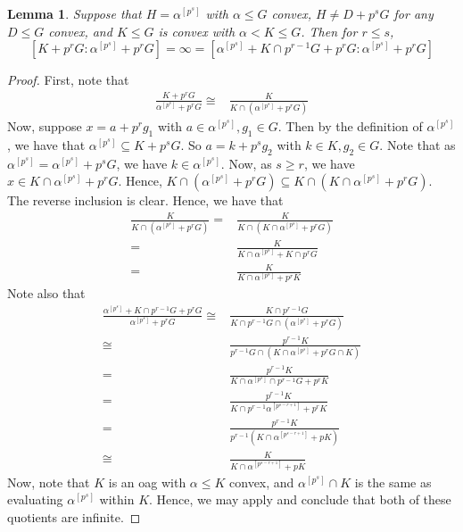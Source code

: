 \documentclass[10pt,a4paper]{amsart}
\newtheorem{lemma}{Lemma}
\begin{document}
\begin{lemma}\label{leftnonconvexconvexrelationship}
	Suppose that $H=\alpha^{[p^s]}$ with $\alpha\leq G$ convex, $H\neq D+p^sG$ for any $D\leq G$ convex, and $K\leq G$ is convex with $\alpha <K\leq G$. Then for $r\leq s$, $$[K+p^rG:\alpha^{[p^s]}+p^rG] =\infty = [\alpha^{[p^s]}+K\cap p^{r-1}G+p^rG:\alpha^{[p^s]}+p^rG] $$
\end{lemma}

\begin{proof}
	First, note that 
	\begin{align*}
		\frac{K+p^rG}{\alpha^{[p^s]}+p^rG} \cong& \frac{K}{K\cap(\alpha^{[p^s]}+p^rG)} %
	\end{align*}
	Now, suppose $x = a+p^rg_1$ with $a\in \alpha^{[p^s]}, g_1\in G$. Then by the definition of $\alpha^{[p^s]}$, we have that $\alpha^{[p^s]}\subseteq K+p^sG$. So $a = k + p^sg_2$ with $k\in K, g_2\in G$. Note that as $\alpha^{[p^s]} = \alpha^{[p^s]}+p^sG$, we have $k\in \alpha^{[p^s]}$. Now, as $s\geq r$, we have $x\in K\cap\alpha^{[p^s]}+p^rG$. Hence, $K\cap (\alpha^{[p^s]}+p^rG)\subseteq K\cap(K\cap\alpha^{[p^s]}+p^rG)$. The reverse inclusion is clear. Hence, we have that 
	\begin{align*}
		\frac{K}{K\cap(\alpha^{[p^s]}+p^rG)} = & \frac{K}{K\cap(K\cap \alpha^{[p^s]}+p^rG)} \\
		= & \frac{K}{K\cap \alpha^{[p^s]}+K\cap p^rG} \\
		= & \frac{K}{K\cap \alpha^{[p^s]}+p^rK}
	\end{align*}
	Note also that
	\begin{align*}
		\frac{\alpha^{[p^s]}+K\cap p^{r-1}G +p^rG}{\alpha^{[p^s]}+p^rG} \cong& \frac{K\cap p^{r-1}G}{K\cap p^{r-1}G\cap(\alpha^{[p^s]}+p^rG)} \\
		\cong& \frac{p^{r-1}K}{p^{r-1}G\cap(K\cap\alpha^{[p^s]}+p^rG\cap K)} \\
		= & \frac{p^{r-1}K}{K\cap\alpha^{[p^s]}\cap p^{r-1}G+p^rK} \\
		= & \frac{p^{r-1}K}{K\cap p^{r-1}\alpha^{[p^{s-r+1}]}+p^rK} \\
		= & \frac{p^{r-1}K}{p^{r-1}(K\cap \alpha^{[p^{s-r+1}]}+pK)} \\
		\cong & \frac{K}{K\cap \alpha^{[p^{s-r+1}]}+pK}
	\end{align*}
	Now, note that $K$ is an oag with $\alpha\leq K$ convex, and $\alpha^{[p^s]}\cap K$ is the same as evaluating $\alpha^{[p^s]}$ within $K$. Hence, we may apply  and conclude that both of these quotients are infinite.
\end{proof}
\end{document}
